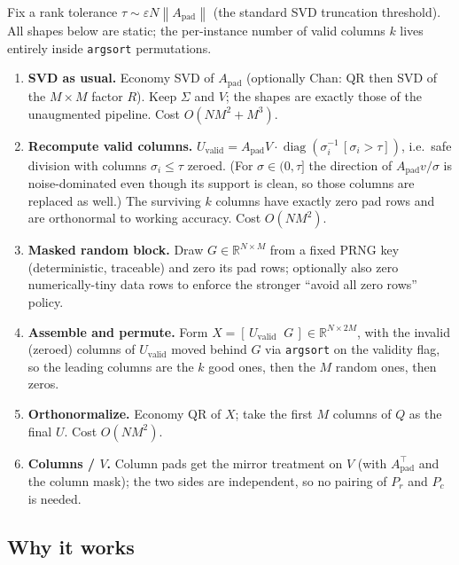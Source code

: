 \documentclass[11pt]{article}
\newcommand{\R}{\mathbb{R}}
\newcommand{\Apad}{A_{\mathrm{pad}}}
\newcommand{\norm}[1]{\left\lVert #1 \right\rVert}
\begin{document}
Fix a rank tolerance $\tau \sim \varepsilon N \norm{\Apad}$ (the standard SVD
truncation threshold). All shapes below are static; the per-instance number of
valid columns $k$ lives entirely inside \texttt{argsort} permutations.

\begin{enumerate}[label=\textbf{Step \arabic*.}, leftmargin=2.2cm, itemsep=3pt]
  \item \textbf{SVD as usual.} Economy SVD of $\Apad$ (optionally Chan: QR then
        SVD of the $M \times M$ factor $R$). Keep $\Sigma$ and $V$; the shapes
        are exactly those of the unaugmented pipeline. Cost $O(NM^2 + M^3)$.
  \item \textbf{Recompute valid columns.}
        $U_{\mathrm{valid}} = \Apad V \cdot
        \operatorname{diag}(\sigma_i^{-1}\,[\sigma_i > \tau])$, i.e.\ safe
        division with columns $\sigma_i \le \tau$ zeroed. (For
        $\sigma \in (0,\tau]$ the direction of $\Apad v/\sigma$ is
        noise-dominated even though its support is clean, so those columns are
        replaced as well.) The surviving $k$ columns have exactly zero pad rows
        and are orthonormal to working accuracy. Cost $O(NM^2)$.
  \item \textbf{Masked random block.} Draw $G \in \R^{N \times M}$ from a fixed
        PRNG key (deterministic, traceable) and zero its pad rows; optionally
        also zero numerically-tiny data rows to enforce the stronger
        ``avoid all zero rows'' policy.
  \item \textbf{Assemble and permute.} Form
        $X = [\,U_{\mathrm{valid}} \;\; G\,] \in \R^{N \times 2M}$, with the
        invalid (zeroed) columns of $U_{\mathrm{valid}}$ moved behind $G$ via
        \texttt{argsort} on the validity flag, so the leading columns are the
        $k$ good ones, then the $M$ random ones, then zeros.
  \item \textbf{Orthonormalize.} Economy QR of $X$; take the first $M$ columns
        of $Q$ as the final $U$. Cost $O(NM^2)$.
  \item \textbf{Columns / $V$.} Column pads get the mirror treatment on $V$
        (with $A_{\mathrm{pad}}^{\top}$ and the column mask); the two sides are
        independent, so no pairing of $P_r$ and $P_c$ is needed.
\end{enumerate}

\subsection*{Why it works}
\end{document}
